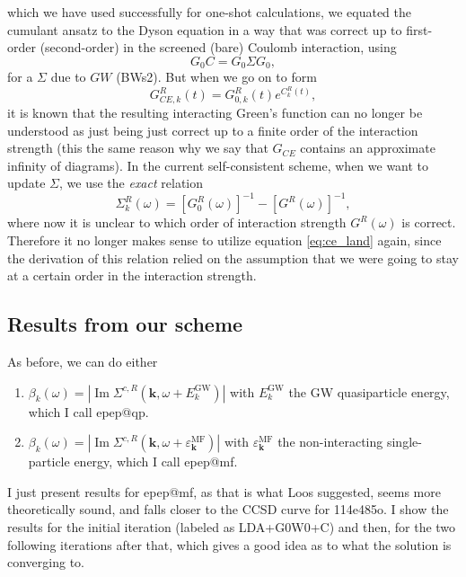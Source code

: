 which we have used successfully for one-shot calculations, we equated the cumulant ansatz to the Dyson equation in a way that was correct up to first-order (second-order) in the screened (bare) Coulomb interaction, using
\begin{equation}
  G_0C=G_0\Sigma G_0 ,
\end{equation}
 for a $\Sigma$ due to $GW$ (BWs2). But when we go on to form
\begin{equation}
     G^{R}_{CE,k}(t) = G_{0,k}^R(t) e^{C_{k}^{R}(t)},
\end{equation}
it is known that the resulting interacting Green's function can no longer be understood as just being just correct up to a finite order of the interaction strength (this the same reason why we say that $G_{CE}$ contains an approximate infinity of diagrams). In the current self-consistent scheme, when we want to update $\Sigma$, we use the \emph{exact} relation 
\begin{equation}
    \Sigma^R_k(\omega ) = \left[G_0^R(\omega )\right]^{-1} - \left[G^R(\omega )\right]^{-1},
\end{equation}
where now it is unclear to which order of interaction strength $G^R(\omega )$ is correct.
Therefore it no longer makes sense to utilize equation \eqref{eq:ce_land} again, since the derivation of this relation relied on the assumption that we were going to stay at a certain order in the interaction strength.
\subsection{Results from our scheme}
As before, we can do either 
\begin{enumerate}
    \item $\beta_k(\omega)= \left|\operatorname{Im} \Sigma^{c,R}(\mathbf{k}, \omega+E^{\text{GW}}_k)\right|$ with $E^{\text{GW}}_k$ the GW quasiparticle energy, which I call epep@qp.
    \item $\beta_k(\omega)= \left|\operatorname{Im} \Sigma^{c,R}(\mathbf{k}, \omega+\varepsilon_{\mathbf{k}}^{\text{MF}})\right|$ with $\varepsilon_{\mathbf{k}}^{\text{MF}}$ the non-interacting single-particle energy, which I call epep@mf.
\end{enumerate}
I just present results for epep@mf, as that is what Loos suggested, seems more theoretically sound, and falls closer to the CCSD curve for 114e485o. I show the results for the initial iteration (labeled as LDA+G0W0+C) and then, for the two following iterations after that, which gives a good idea as to what the solution is converging to.
